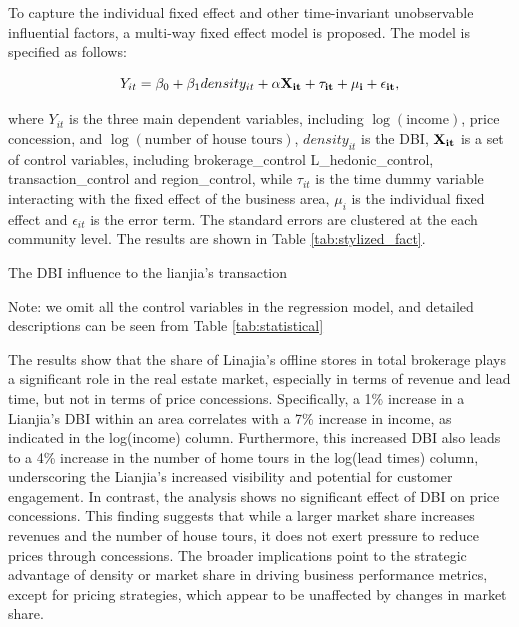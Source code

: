 \documentclass[12pt]{article}
\begin{document}
To capture the individual fixed effect and other time-invariant unobservable influential factors, a multi-way fixed effect model is proposed. The model is specified as follows:

\begin{equation}
  Y_{it} = \beta_0 + \beta_1 density_{it} + \bf{\alpha} \bf{X}_{it} + \tau_{it} + \mu_i + \epsilon_{it}, \label{eq:multi-way-fe}
\end{equation}

where $Y_{it}$ is the three main dependent variables, including $\log(\text{income})$, price concession, and $\log(\text{number of house tours})$, $density_{it}$ is the DBI, $\bf{X}_{it}$ is a set of control variables, including brokerage\_control L\_hedonic\_control, transaction\_control and region\_control, while $\tau_{it}$ is the time dummy variable interacting with the fixed effect of the business area, $\mu_i$ is the individual fixed effect and $\epsilon_{it}$ is the error term. The standard errors are clustered at the each community level. The results are shown in Table \ref{tab:stylized_fact}.

\begin{table}[htb!]
    \centering
    \begin{scriptsize}
    
    \caption{The DBI influence to the lianjia's transaction}

    Note: we omit all the control variables in the regression model, and detailed descriptions can be seen from Table \ref{tab:statistical}
    \label{tab:stylized_fact}
    \end{scriptsize}
\end{table}

The results show that the share of Linajia's offline stores in total brokerage plays a significant role in the real estate market, especially in terms of revenue and lead time, but not in terms of price concessions. Specifically, a 1\% increase in a Lianjia's DBI within an area correlates with a 7\% increase in income, as indicated in the log(income) column. Furthermore, this increased DBI also leads to a 4\% increase in the number of home tours in the log(lead times) column, underscoring the Lianjia's increased visibility and potential for customer engagement. In contrast, the analysis shows no significant effect of DBI on price concessions. This finding suggests that while a larger market share increases revenues and the number of house tours, it does not exert pressure to reduce prices through concessions. The broader implications point to the strategic advantage of density or market share in driving business performance metrics, except for pricing strategies, which appear to be unaffected by changes in market share.
\end{document}
